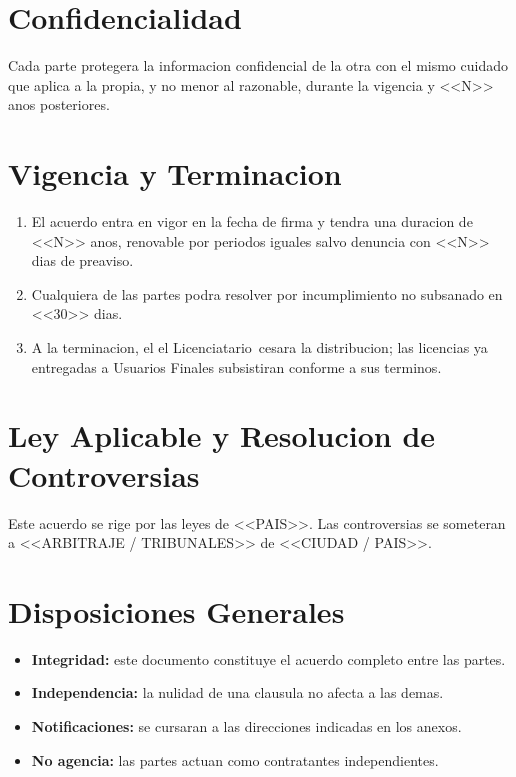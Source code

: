 \documentclass[11pt,a4paper]{article}
\newcommand{\LicenciatarioAbrev}{el Licenciatario}
\newcommand{\Jurisdiccion}{<<CIUDAD / PAIS>>}
\newcommand{\LeyAplicable}{<<PAIS>>}
\begin{document}
\section{Confidencialidad}
Cada parte protegera la informacion confidencial de la otra con el mismo cuidado que aplica
a la propia, y no menor al razonable, durante la vigencia y <<N>> anos posteriores.

\section{Vigencia y Terminacion}
\begin{enumerate}
  \item El acuerdo entra en vigor en la fecha de firma y tendra una duracion de <<N>>
        anos, renovable por periodos iguales salvo denuncia con <<N>> dias de preaviso.
  \item Cualquiera de las partes podra resolver por incumplimiento no subsanado en <<30>> dias.
  \item A la terminacion, el \LicenciatarioAbrev\ cesara la distribucion; las licencias ya
        entregadas a Usuarios Finales subsistiran conforme a sus terminos.
\end{enumerate}

\section{Ley Aplicable y Resolucion de Controversias}
Este acuerdo se rige por las leyes de \LeyAplicable. Las controversias se someteran a
<<ARBITRAJE / TRIBUNALES>> de \Jurisdiccion.

\section{Disposiciones Generales}
\begin{itemize}
  \item \textbf{Integridad:} este documento constituye el acuerdo completo entre las partes.
  \item \textbf{Independencia:} la nulidad de una clausula no afecta a las demas.
  \item \textbf{Notificaciones:} se cursaran a las direcciones indicadas en los anexos.
  \item \textbf{No agencia:} las partes actuan como contratantes independientes.
\end{itemize}

\vspace{1.5em}
\end{document}

